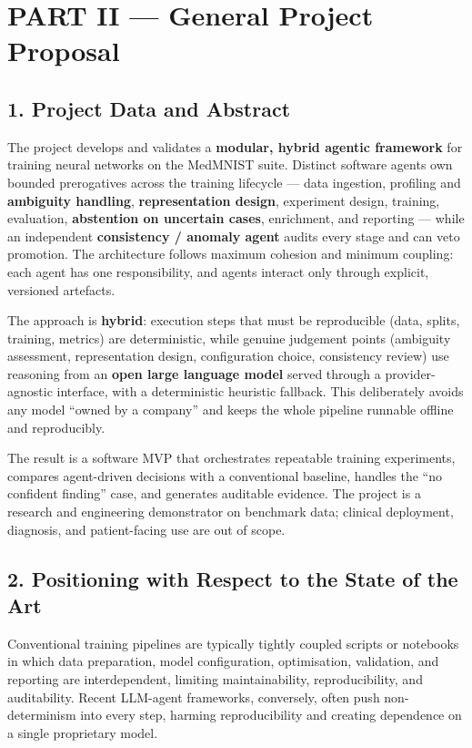 \documentclass[11pt,a4paper]{article}
\begin{document}
\section*{PART II --- General Project Proposal}

\subsection*{1. Project Data and Abstract}
The project develops and validates a \textbf{modular, hybrid agentic framework} for training neural networks on the MedMNIST suite. Distinct software agents own bounded prerogatives across the training lifecycle --- data ingestion, profiling and \textbf{ambiguity handling}, \textbf{representation design}, experiment design, training, evaluation, \textbf{abstention on uncertain cases}, enrichment, and reporting --- while an independent \textbf{consistency / anomaly agent} audits every stage and can veto promotion. The architecture follows maximum cohesion and minimum coupling: each agent has one responsibility, and agents interact only through explicit, versioned artefacts.

The approach is \textbf{hybrid}: execution steps that must be reproducible (data, splits, training, metrics) are deterministic, while genuine judgement points (ambiguity assessment, representation design, configuration choice, consistency review) use reasoning from an \textbf{open large language model} served through a provider-agnostic interface, with a deterministic heuristic fallback. This deliberately avoids any model ``owned by a company'' and keeps the whole pipeline runnable offline and reproducibly.

The result is a software MVP that orchestrates repeatable training experiments, compares agent-driven decisions with a conventional baseline, handles the ``no confident finding'' case, and generates auditable evidence. The project is a research and engineering demonstrator on benchmark data; clinical deployment, diagnosis, and patient-facing use are out of scope.

\subsection*{2. Positioning with Respect to the State of the Art}
Conventional training pipelines are typically tightly coupled scripts or notebooks in which data preparation, model configuration, optimisation, validation, and reporting are interdependent, limiting maintainability, reproducibility, and auditability. Recent LLM-agent frameworks, conversely, often push non-determinism into every step, harming reproducibility and creating dependence on a single proprietary model.
\end{document}
